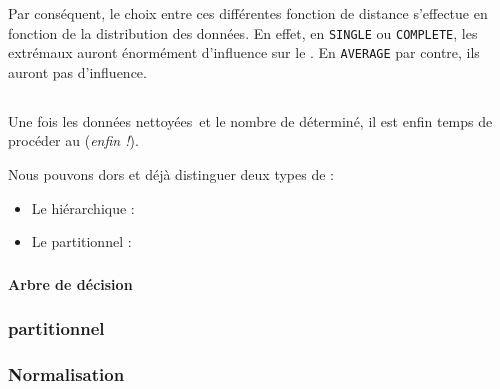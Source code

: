Par conséquent, le choix entre ces différentes fonction de distance s'effectue en fonction de la distribution des données. En effet, en \texttt{SINGLE} ou \texttt{COMPLETE}, les extrémaux auront énormément d'influence sur le . En \texttt{AVERAGE} par contre, ils auront \apriori pas d'influence.

\subsection{}
Une fois les données \og nettoyées\fg~et le nombre de  déterminé, il est enfin temps de procéder au  (\textsl{enfin !}).

Nous pouvons dors et déjà distinguer deux types de  :
\begin{itemize}
	\item Le  hiérarchique :
	\item Le  partitionnel :
\end{itemize}

\subsubsection{}
\paragraph{Arbre de décision}

\subsubsection{ partitionnel}
\paragraph{}

\paragraph {} 

\subsubsection{Normalisation}
